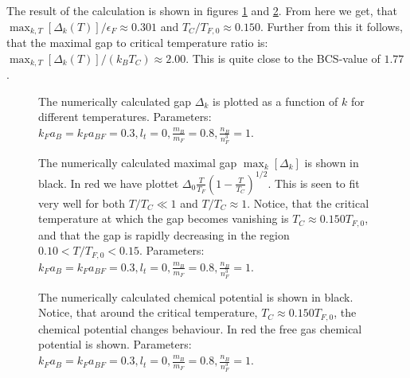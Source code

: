 The result of the calculation is shown in figures \ref{fig.Deltakkdepend} and \ref{fig.maxkDeltakTdepend}. From here we get, that $\max_{k,T}[\Delta_k(T)]/\epsilon_F \approx 0.301$ and $T_C/T_{F,0} \approx 0.150$. Further from this it follows, that the maximal gap to critical temperature ratio is: $\max_{k,T}[\Delta_k(T)]/(k_B T_C) \approx 2.00$. This is quite close to the BCS-value of $1.77$ \cite{BruusFlensberg}.  

\begin{figure} 
\begin{center}  
  
\caption{The numerically calculated gap $\Delta_k$ is plotted as a function of $k$ for different temperatures. Parameters: $k_F a_B = k_F a_{BF} = 0.3, l_t = 0, \frac{m_B}{m_F} = 0.8, \frac{n_B}{n_F^3} = 1$. }  
\label{fig.Deltakkdepend}  
\end{center}    
\end{figure}

\begin{figure} 
\begin{center}  
  
\caption{The numerically calculated maximal gap $\max_k[\Delta_k]$ is shown in black. In red we have plottet $\Delta_0 \frac{T}{T_F}\left(1 - \frac{T}{T_C}\right)^{1/2}$. This is seen to fit very well for both $T/T_C \ll 1$ and $T/T_C \approx 1$. Notice, that the critical temperature at which the gap becomes vanishing is $T_C \approx 0.150 T_{F,0}$, and that the gap is rapidly decreasing in the region $0.10< T/T_{F,0} < 0.15$. Parameters: $k_F a_B = k_F a_{BF} = 0.3, l_t = 0, \frac{m_B}{m_F} = 0.8, \frac{n_B}{n_F^3} = 1$. }  
\label{fig.maxkDeltakTdepend}  
\end{center}    
\end{figure}

\begin{figure} 
\begin{center}  
  
\caption{The numerically calculated chemical potential is shown in black. Notice, that around the critical temperature, $T_C \approx 0.150 T_{F,0}$, the chemical potential changes behaviour. In red the free gas chemical potential is shown. Parameters: $k_F a_B = k_F a_{BF} = 0.3, l_t = 0, \frac{m_B}{m_F} = 0.8, \frac{n_B}{n_F^3} = 1$. }  
\label{fig.chempot}  
\end{center}    
\end{figure}

